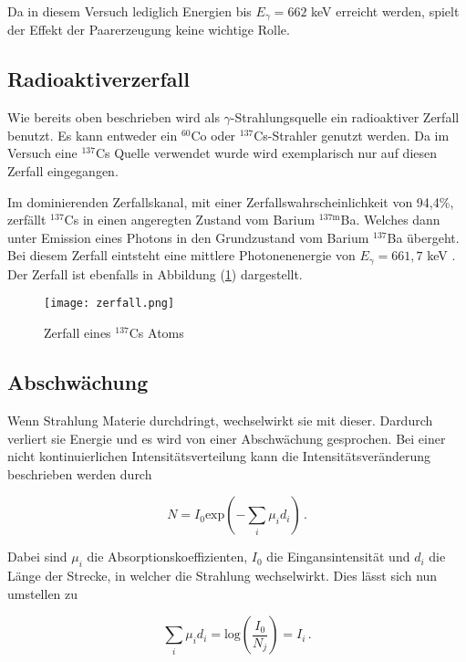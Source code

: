\noindent
Da in diesem Versuch lediglich Energien bis $E_{\gamma} = 662$ keV erreicht werden, spielt der Effekt der Paarerzeugung keine wichtige Rolle. 


\subsection{Radioaktiverzerfall}
Wie bereits oben beschrieben wird als $\gamma$-Strahlungsquelle ein radioaktiver Zerfall benutzt. Es kann entweder ein $^{60} $Co oder $^{137} $Cs-Strahler genutzt werden.
Da im Versuch eine $^{137} $Cs Quelle verwendet wurde wird exemplarisch nur auf diesen Zerfall eingegangen.

\noindent
Im dominierenden Zerfallskanal, mit einer Zerfallswahrscheinlichkeit von 94,4\%, zerfällt $^{137}$Cs in einen angeregten Zustand vom Barium $^{137\text{m}} $Ba. Welches dann
unter Emission eines Photons in den Grundzustand vom Barium $^{137} $Ba übergeht. Bei diesem Zerfall eintsteht eine mittlere Photonenenergie von $E_{\gamma} = 661,7$ keV \cite{Zerfall}.
Der Zerfall ist ebenfalls in Abbildung (\ref{fig:zer}) dargestellt.


\begin{figure}
  \centering
  \texttt{[image: zerfall.png]}
  \caption{Zerfall eines $^{137} $Cs Atoms \cite{Zerfall}}
  \label{fig:zer}
\end{figure}


\subsection{Abschwächung}
Wenn Strahlung Materie durchdringt, wechselwirkt sie mit dieser. Dardurch verliert sie Energie und es wird von einer Abschwächung gesprochen.
Bei einer nicht kontinuierlichen Intensitätsverteilung kann die Intensitätsveränderung beschrieben werden durch 

\begin{equation}
  N = I_0 \text{exp} \left(- \sum_i \mu_i d_i \right) \, .
  \label{eqn:exp}
\end{equation}

Dabei sind $\mu_i$ die Absorptionskoeffizienten, $I_0$ die Eingansintensität und $d_i$ die Länge der Strecke, in welcher die Strahlung wechselwirkt. Dies 
lässt sich nun umstellen zu 

\begin{equation}
  \sum_i \mu_i d_i = \text{log} \left( \frac{I_0}{N_j}  \right) = I_i \, .
  \label{eqn:log}
\end{equation}

